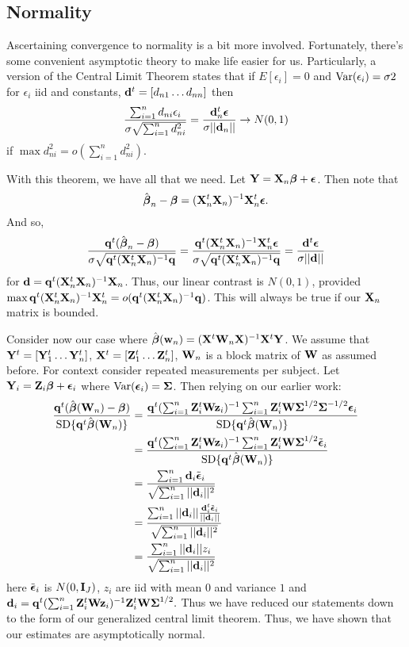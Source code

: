 \subsection{Normality}
Ascertaining convergence to normality is a bit more involved.
Fortunately, there's some convenient asymptotic theory to 
make life easier for us. Particularly, a version of the
Central Limit Theorem states that if $E[\epsilon_i] = 0$ and
$\mbox{Var}(\epsilon_i) = \sigma2$ for $\epsilon_i$ iid and constants, $\mathbf{d}^t
= [d_{n1} \ldots d_{nn}]$ then
$$
\frac{\sum_{i=1}^n d_{ni} \epsilon_i}{\sigma \sqrt{\sum_{i=1}^n d_{ni}^2 }}
=  \frac{ \mathbf{d}_n ^ t \boldsymbol{\epsilon} }{\sigma|| \mathbf{d}_n ||} \rightarrow N(0, 1)
$$
if $\max d_{ni}^2 = o(\sum_{i=1}^n d_{ni}^2)$.

With this theorem, we have all that we need. Let
$\mathbf{Y} = \mathbf{X}_n \boldsymbol{\beta} + \boldsymbol{\epsilon}$. Then note that
$$
\hat {\boldsymbol{\beta}}_n  - \boldsymbol{\beta} 
= (\mathbf{X}_n^t \mathbf{X}_n)^{-1} \mathbf{X}_n^t \boldsymbol{\epsilon}. 
$$
And so,
$$
\frac{\bq^t(\hat \bbeta_n  - \bbeta)}{\sigma \sqrt{\bq^t (\bX_n^t \bX_n)^{-1} \bq}}=
\frac{\bq^t (\bX_n^t \bX_n)^{-1} \bX_n^t \beps}%
{\sigma \sqrt{\bq^t (\bX_n^t \bX_n)^{-1} \bq}}
= \frac{\bd^t \beps}{\sigma ||\bd||}
$$
for $\mathbf{d} = \mathbf{q}^t (\mathbf{X}_n^t \mathbf{X}_n)^{-1}\mathbf{X}_n$. Thus, our linear contrast
is $N(0,1)$, provided $\max \mathbf{q}^t (\mathbf{X}_n^t \mathbf{X}_n)^{-1}\mathbf{X}_n^t = o(\mathbf{q}^t (\mathbf{X}_n^t \mathbf{X}_n)^{-1} \mathbf{q})$.
This will always be true if our $\mathbf{X}_n$ matrix is bounded.

Consider now our case where $\hat {\boldsymbol{\beta}} (\mathbf{w}_n) = (\mathbf{X}^t \mathbf{W}_n \mathbf{X})^{-1} \mathbf{X}^t \mathbf{Y}$. We
assume that $\mathbf{Y}^t = [\mathbf{Y}_1^t \ldots \mathbf{Y}_n^t]$, $\mathbf{X}^t = [\mathbf{Z}_1^t \ldots \mathbf{Z}_n^t]$,
$\mathbf{W}_n$ is a block matrix of $\mathbf{W}$ as assumed before. For context consider repeated measurements
per subject. Let $\mathbf{Y}_i = \mathbf{Z}_i \boldsymbol{\beta} + \boldsymbol{\epsilon}_i$ where $\mbox{Var}(\boldsymbol{\epsilon}_i) = \boldsymbol{\Sigma}$. Then
relying on our earlier work:
\begin{align*}
\frac{\bq^t (\hat \bbeta(\bW_n) - \bbeta)}{\mbox{SD}\{\bq^t \hat \bbeta(\bW_n)\}}
& =  \frac{\bq^t(\sum_{i=1}^n \bZ_i^t \bW \bz_i)^{-1}\sum_{i=1}^n \bZ_i^t \bW \bSigma^{1/2} \bSigma^{-1/2} \beps_i}%
{\mbox{SD}\{\bq^t \hat \bbeta(\bW_n)\}} \\
& = \frac{\bq^t(\sum_{i=1}^n \bZ_i^t \bW \bz_i)^{-1}\sum_{i=1}^n \bZ_i^t \bW \bSigma^{1/2} \tilde \beps_i}%
{\mbox{SD}\{\bq^t \hat \bbeta(\bW_n)\}} \\
& = \frac{\sum_{i=1}^n \bd_{i} \tilde \beps_i}{\sqrt{\sum_{i=1}^n ||\bd_i ||^2}} \\
& = \frac{\sum_{i=1}^n ||\bd_i|| \frac{\bd_i^t \tilde \beps_i}{||\bd_i||}}{\sqrt{\sum_{i=1}^n ||\bd_i ||^2}} \\
& = \frac{\sum_{i=1}^n ||\bd_i|| z_i}{\sqrt{\sum_{i=1}^n ||\bd_i ||^2}} 
\end{align*}
here $\tilde {\boldsymbol{\epsilon}}_i$ is $N(0,\mathbf{I}_{J})$, $z_i$ are iid with mean $0$ and variance $1$ and
$
\mathbf{d}_i = \mathbf{q}^t(\sum_{i=1}^n \mathbf{Z}_i^t \mathbf{W} \mathbf{z}_i)^{-1} \mathbf{Z}_i^t \mathbf{W} \boldsymbol{\Sigma}^{1/2}.
$
Thus we have reduced our statements down to the form of our generalized central limit theorem. 
Thus, we have shown that our estimates are asymptotically normal.

